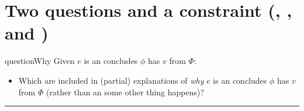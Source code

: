 \documentclass[10pt]{article}
\newcommand{\squareBullet}{\textcolor{black}{\raisebox{.45ex}{\rule{.6ex}{.6ex}}}}
\newcommand\lLine{{\color{lightgray} \noindent\rule{\textwidth}{0.4pt}}}
\begin{document}
\begin{comment}
  The constraint on reasoning that is stated with these abstraction is intended to be theory-neutral level.
\end{comment}


\begin{comment}
  If you like, think of this as a relation of support.
  However, \fofr{1} are understood descriptively, i.e.\ there's no normative constraints on \fofr{1} here.
  If you'd like additional motivation for this sort of thing, consider propositional justification.
\end{comment}

\section{Two questions and a constraint \hfill (\qWhy{}, \qHow{}, and \issueInclusion{})}
\label{sec:target}

\vfill

\begin{comment}
  With from and \fofr{1} in hand, two questions.
\end{comment}

\begin{note}
  \begin{question}{questionWhy}{\qWhy{}}
    Given \(e\) is an  \vAgent{} concludes \prop{} \(\phi\) has \val{} \(v\) from \pool{} \(\Phi\):
    \begin{itemize}[label = \squareBullet]
    \item
      Which  are included in (partial) explanations of \emph{why} \(e\) is an  \vAgent{} concludes \prop{} \(\phi\) has \val{} \(v\) from \pool{} \(\Phi\) (rather than an  some other thing happens)?
    \end{itemize}
    \vspace{-1.25\baselineskip}
  \end{question}
\end{note}


\lLine
\end{document}
